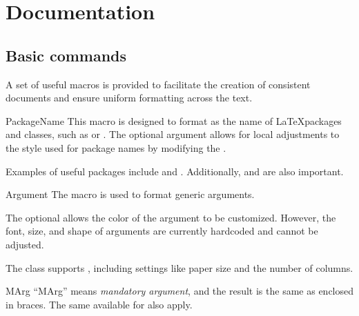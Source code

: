 \documentclass[11pt, outdir = ./out]{article}
\begin{document}
\section {Documentation}

\subsection{Basic commands}

A set of useful macros is provided to facilitate the creation of consistent documents and ensure uniform formatting across the text.

\begin{Macrodef}{PackageName}{}{}
    This macro is designed to format  as the name of \LaTeX packages and classes, such as  or . The optional argument  allows for local adjustments to the style used for package names by modifying the .
\end{Macrodef}

\begin{DocsExample}
    Examples of useful packages include  and . Additionally,  and  are also important.
\end{DocsExample}

\begin{Macrodef}{Argument}{}{}
    The  macro is used to format generic arguments.

    The optional  allows the color of the argument to be customized. However, the font, size, and shape of arguments are currently hardcoded and cannot be adjusted.
\end{Macrodef}

\begin{DocsExample}
    The  class supports , including settings like paper size and the number of columns.
\end{DocsExample}

\begin{Macrodef}{MArg}{}{}
    ``MArg'' means \textit{mandatory argument}, and the result is the same as  enclosed in braces. The same  available for  also apply.
\end{Macrodef}
\end{document}
